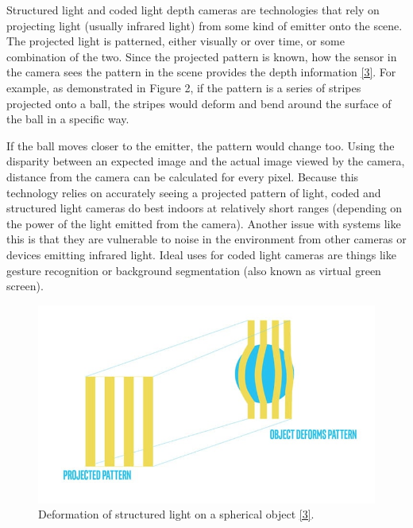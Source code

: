 \documentclass{article}
\begin{document}
Structured light and coded light depth cameras are technologies that rely on projecting light (usually infrared light) from some kind of emitter onto the scene. The projected light is patterned, either visually or over time, or some combination of the two. Since the projected pattern is known, how the sensor in the camera sees the pattern in the scene provides the depth information \href{https://www.intelrealsense.com/beginners-guide-to-depth/}{[3]}. For example, as demonstrated in Figure 2, if the pattern is a series of stripes projected onto a ball, the stripes would deform and bend around the surface of the ball in a specific way.

If the ball moves closer to the emitter, the pattern would change too. Using the disparity between an expected image and the actual image viewed by the camera, distance from the camera can be calculated for every pixel. Because this technology relies on accurately seeing a projected pattern of light, coded and structured light cameras do best indoors at relatively short ranges (depending on the power of the light emitted from the camera). Another issue with systems like this is that they are vulnerable to noise in the environment from other cameras or devices emitting infrared light. Ideal uses for coded light cameras are things like gesture recognition or background segmentation (also known as virtual green screen).

\begin{figure}[h] %
	\centering
	\includegraphics[width=1\columnwidth]{report1-img001.png} %
	\caption{Deformation of structured light on a spherical object \href{https://www.intelrealsense.com/beginners-guide-to-depth/}{[3]}.}
\end{figure}
\end{document}
